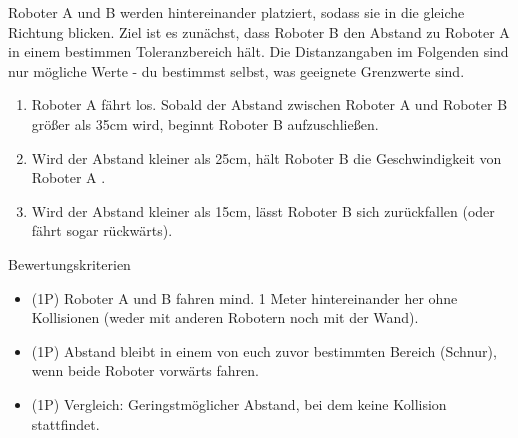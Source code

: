 \documentclass[
	12pt,
	article,
	type=bsc, %
	colorbacktitle,
	instlogo,
	accentcolor=tud1c,
	draft,
	german,
	twoside
]{tudexercise}
\begin{document}
	Roboter A und B werden hintereinander platziert, sodass sie in die gleiche Richtung blicken. Ziel ist es zunächst, dass Roboter B den Abstand zu Roboter A in einem bestimmen Toleranzbereich hält. Die Distanzangaben im Folgenden sind nur mögliche Werte - du bestimmst selbst, was geeignete Grenzwerte sind.
	\begin{enumerate}
	\item Roboter A fährt los. Sobald der Abstand zwischen Roboter A und Roboter B größer als 35cm wird, beginnt Roboter B aufzuschließen.
	\item Wird der Abstand kleiner als 25cm, hält Roboter B die Geschwindigkeit von Roboter A .
	\item Wird der Abstand kleiner als 15cm, lässt Roboter B sich zurückfallen (oder fährt sogar rückwärts).
	\end{enumerate}
	Bewertungskriterien
	\begin{itemize}
	\item (1P) Roboter A und B fahren mind. 1 Meter hintereinander her ohne Kollisionen (weder mit anderen Robotern noch mit der Wand).
	\item (1P) Abstand bleibt in einem von euch zuvor bestimmten Bereich (Schnur), wenn beide Roboter vorwärts fahren.
	\item (1P) Vergleich: Geringstmöglicher Abstand, bei dem keine Kollision stattfindet.
	\end{itemize}
	
	\newpage
\end{document}
